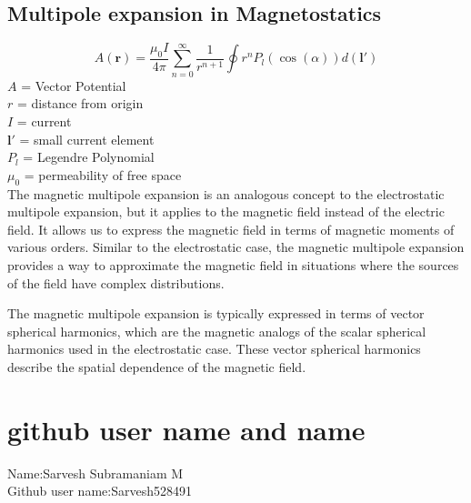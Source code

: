 \documentclass[12pt,a4paper]{article}
\begin{document}
\subsection{Multipole expansion in Magnetostatics}
\begin{equation}
A(\mathbf{r}) = \frac{\mu_0I}{4\pi} \sum_{n=0}^{\infty} \frac{1}{r^{n+1}} \oint r^{n} P_l(\cos(\alpha))d(\mathbf{l}') 
\end{equation}
$A$ = Vector Potential\\
$r$ = distance from origin \\
$I$ = current\\
$\mathbf{l}'$ = small current element\\
$P_l$ = Legendre Polynomial \\
$\mu_0$ = permeability of free space\\
The magnetic multipole expansion is an analogous concept to the electrostatic multipole expansion, but it applies to the magnetic field instead of the electric field. It allows us to express the magnetic field in terms of magnetic moments of various orders. Similar to the electrostatic case, the magnetic multipole expansion provides a way to approximate the magnetic field in situations where the sources of the field have complex distributions.

The magnetic multipole expansion is typically expressed in terms of vector spherical harmonics, which are the magnetic analogs of the scalar spherical harmonics used in the electrostatic case. These vector spherical harmonics describe the spatial dependence of the magnetic field.
\section{github user name and name}
Name:Sarvesh Subramaniam M \\
Github user name:Sarvesh528491
\end{document}
